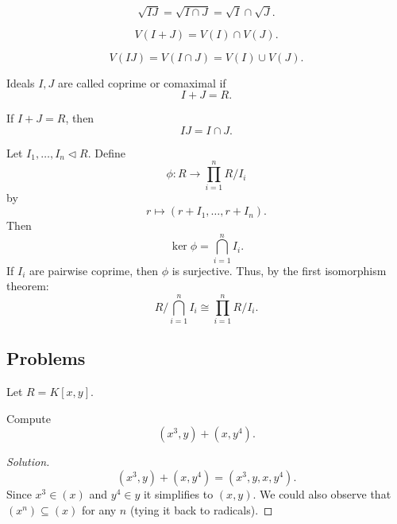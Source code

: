 \documentclass[11pt]{article}
\begin{document}
\begin{prop}
    \[
        \sqrt{IJ} = \sqrt{I\cap J} = \sqrt{I} \cap \sqrt J.
    \]
\end{prop}

\begin{prop}
    \[
        V(I + J) = V(I) \cap V(J).
    \]
\end{prop}

\begin{prop}
    \[
        V(IJ) = V(I \cap J) = V(I) \cup V(J).
    \]
\end{prop}

\begin{defn}
    Ideals $I,J$ are called coprime or comaximal if 
    \[
        I+J = R. 
    \]
\end{defn}

\begin{prop}
    If $I + J = R$, then 
    \[
        IJ = I \cap J.
    \]
\end{prop}


\begin{thm}
    Let $I_1,\ldots, I_n \triangleleft R$. 
    Define 
    \[
        \phi : R \to \prod_{i=1}^n R/I_i
    \]
    by 
    \[
        r \mapsto (r + I_1, \ldots, r + I_n). 
    \]
    Then 
    \[
        \ker \phi = \bigcap_{i=1}^n I_i.
    \]
    If $I_i$ are pairwise coprime, then $\phi$ is surjective. 
    Thus, by the first isomorphism theorem: 
    \[
        R\big/\bigcap_{i=1}^n I_i \cong \prod_{i=1}^n R/I_i. 
    \]

\end{thm}

\subsection{Problems}

Let $R = K[x,y]$.
\begin{prob}
    Compute 
    \[
        (x^3, y ) + (x, y^4). 
    \]
\end{prob}
\begin{proof}[Solution]
    \[
        (x^3,y) + (x,y^4) = (x^3, y, x, y^4). 
    \]
    Since $x^3 \in (x)$ and $y^4 \in y$ it simplifies to 
    $(x,y)$. We could also observe that $(x^n) \subseteq (x)$ 
    for any $n$ (tying it back to radicals).
\end{proof}
\end{document}

